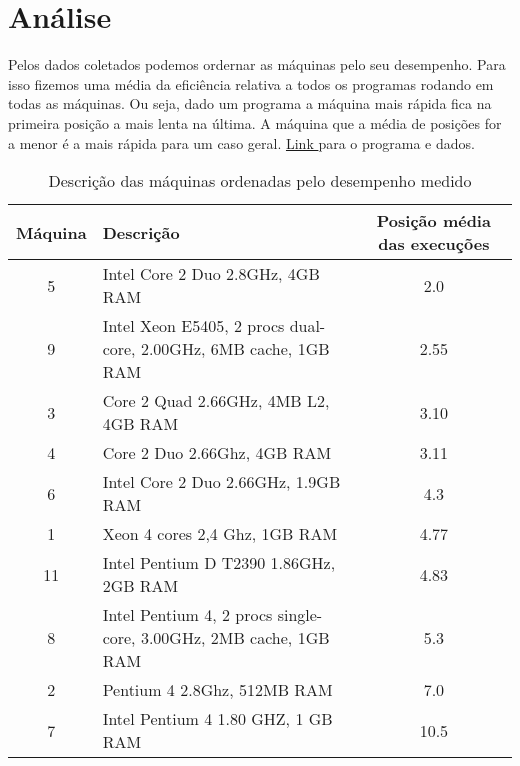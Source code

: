 \documentclass[10pt,a4paper]{article}
\begin{document}
\section{Análise}
Pelos dados coletados podemos ordernar as máquinas pelo seu
desempenho.
Para isso fizemos uma média da eficiência relativa a todos os
programas rodando em todas as máquinas. Ou seja, dado um programa a
máquina mais rápida fica na primeira posição a mais lenta na última.
A máquina que a média de posições for a menor é a mais rápida para um
caso geral. \href{http://tinyurl.com/6k3ypjz}{Link } para o programa e dados.
\begin{table}[h!]
\caption{Descrição das máquinas ordenadas pelo desempenho medido}
\begin{tabular}{clc}
\hline
Máquina & Descrição & Posição média das execuções\\
\hline
5	&	Intel Core 2 Duo 2.8GHz, 4GB RAM & 2.0\\
9 &	Intel Xeon E5405, 2 procs dual-core, 2.00GHz, 6MB cache, 1GB
RAM & 2.55\\
3	&	Core 2 Quad 2.66GHz, 4MB L2, 4GB RAM & 3.10\\
4	&	Core 2 Duo 2.66Ghz, 4GB RAM & 3.11\\
6	&	Intel Core 2 Duo 2.66GHz, 1.9GB RAM & 4.3 \\
1	&	  Xeon 4 cores 2,4 Ghz, 1GB RAM & 4.77\\
11 &	Intel Pentium D T2390 1.86GHz, 2GB RAM & 4.83\\
8 &	Intel Pentium 4, 2 procs single-core, 3.00GHz, 2MB cache, 1GB
RAM & 5.3\\
2	&	Pentium 4 2.8Ghz, 512MB RAM & 7.0\\
7	&	Intel Pentium 4 1.80 GHZ, 1 GB RAM & 10.5\\
\hline
\end{tabular}
\end{table}
\end{document}
